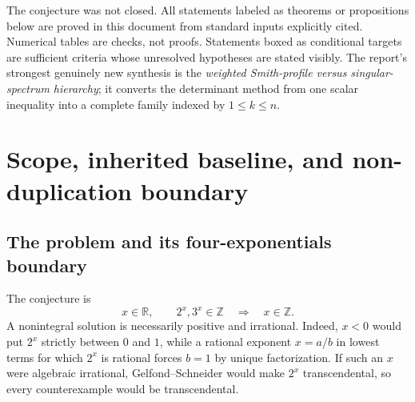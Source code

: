 \documentclass[11pt,oneside]{article}
\theoremstyle{definition}
\theoremstyle{remark}
\newcommand{\R}{\mathbb{R}}
\newcommand{\Z}{\mathbb{Z}}
\begin{document}
\begin{abstract}
The probability-theoretic part proves an exact min-entropy anti-concentration bound for random prime-valuation vectors, then shows that a hypothetical counterexample saturates the associated entropy-rank bound: both integer outputs separately recover the two latent semigroup coordinates.  Thus generic Littlewood--Offord reasoning can recover the known rank-two structure but has no entropy slack with which to force rank one.  Two further no-go theorems show that natural positive-semidefinite/Hadamard-power constructions are infinitely divisible and therefore blind to the arithmetic exponent, while the formal prime-log quadratic is sign-indefinite on the positive cone.

No unconditional proof is claimed.  The report ends with four precise proof certificates, an obstacle ledger, and a computational program in which random minor sampling and random-prime scouting are used only to locate candidates that are then certified exactly.
\end{abstract}

\begin{statusbox}
The conjecture was not closed.  All statements labeled as theorems or propositions below are proved in this document from standard inputs explicitly cited.  Numerical tables are checks, not proofs.  Statements boxed as conditional targets are sufficient criteria whose unresolved hypotheses are stated visibly.  The report's strongest genuinely new synthesis is the \emph{weighted Smith-profile versus singular-spectrum hierarchy}; it converts the determinant method from one scalar inequality into a complete family indexed by $1\leq k\leq n$.
\end{statusbox}

\tableofcontents
\newpage

\section{Scope, inherited baseline, and non-duplication boundary}
\label{sec:scope}

\subsection{The problem and its four-exponentials boundary}

The conjecture is
\begin{equation}
  x\in\R,\qquad 2^x,3^x\in\Z
  \quad\Longrightarrow\quad x\in\Z.
  \label{eq:AE}
\end{equation}
A nonintegral solution is necessarily positive and irrational.  Indeed, $x<0$ would put $2^x$ strictly between $0$ and $1$, while a rational exponent $x=a/b$ in lowest terms for which $2^x$ is rational forces $b=1$ by unique factorization.  If such an $x$ were algebraic irrational, Gelfond--Schneider would make $2^x$ transcendental, so every counterexample would be transcendental.
\end{document}
